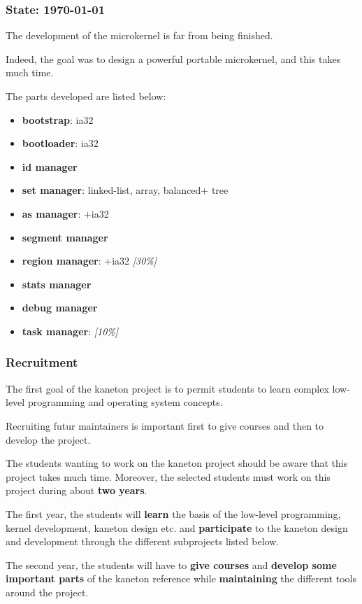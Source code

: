 \begin{frame}
  \frametitle{State: \textbf{\today}}

  The development of the microkernel is far from being finished.

  \-

  Indeed, the goal was to design a powerful portable microkernel, and this
  takes much time.

  \-

  The parts developed are listed below:

  \begin{itemize}[<+->]
    \item
      \textbf{bootstrap}: ia32
    \item
      \textbf{bootloader}: ia32
    \item
      \textbf{id manager}
    \item
      \textbf{set manager}: linked-list, array, balanced+ tree
    \item
      \textbf{as manager}: +ia32
    \item
      \textbf{segment manager}
    \item
      \textbf{region manager}: +ia32 \textit{[30\%]}
    \item
      \textbf{stats manager}
    \item
      \textbf{debug manager}
    \item
      \textbf{task manager}: \textit{[10\%]}
  \end{itemize}
\end{frame}


\begin{frame}
  \frametitle{Recruitment}

  The first goal of the kaneton project is to permit students to
  learn complex low-level programming and operating system concepts.

  \-

  Recruiting futur maintainers is important first to give courses
  and then to develop the project.

  \-

  The students wanting to work on the kaneton project should be aware
  that this project takes much time. Moreover, the selected students
  must work on this project during about \textbf{two years}.

  \-

  The first year, the students will \textbf{learn} the basis of the low-level
  programming, kernel development, kaneton design etc. and
  \textbf{participate} to the kaneton design and development through
  the different subprojects listed below.

  \-

  The second year, the students will have to \textbf{give courses} and
  \textbf{develop some important parts} of the kaneton reference while
  \textbf{maintaining} the different tools around the project.
\end{frame}

